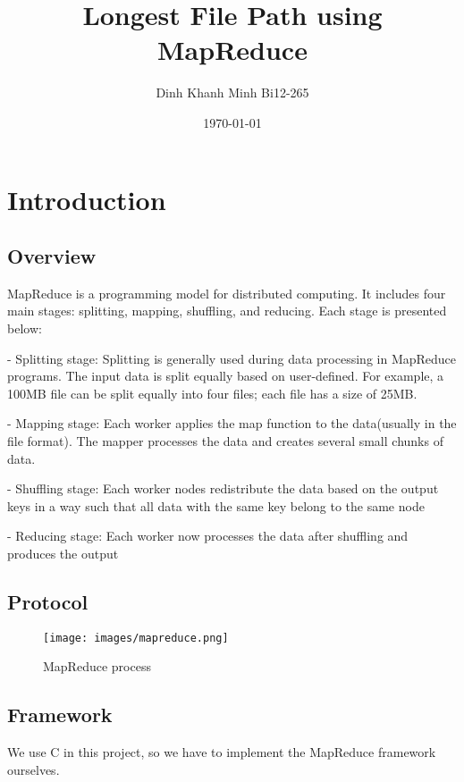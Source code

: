 \documentclass[]{article}
\begin{document}
\title{Longest File Path using MapReduce}
\author{Dinh Khanh Minh Bi12-265}
\date{\today}

\maketitle

\tableofcontents
\newpage

\section{Introduction}
\subsection{Overview}
\noindent%
MapReduce is a programming model for distributed computing. It includes four main stages: splitting, mapping, shuffling, and reducing. Each stage is presented below:

\noindent%
- Splitting stage: Splitting is generally used during data processing in MapReduce programs. The input data is split equally based on user-defined. For example, a 100MB file can be split equally into four files; each file has a size of 25MB.

\noindent%
- Mapping stage: Each worker applies the map function to the data(usually in the file format). The mapper processes the data and creates several small chunks of data.

\noindent%
- Shuffling stage: Each worker nodes redistribute the data based on the output keys in a way such that all data with the same key belong to the same node

\noindent%
- Reducing stage: Each worker now processes the data after shuffling and produces the output


\subsection{Protocol}
\begin{figure}[h]
    \centering
    \texttt{[image: images/mapreduce.png]}
    \caption{MapReduce process\cite{MPI word count}}
    \label{fig:protocol}
\end{figure}

\subsection{Framework}
\noindent%
We use C in this project, so we have to implement the MapReduce framework ourselves.
\end{document}

